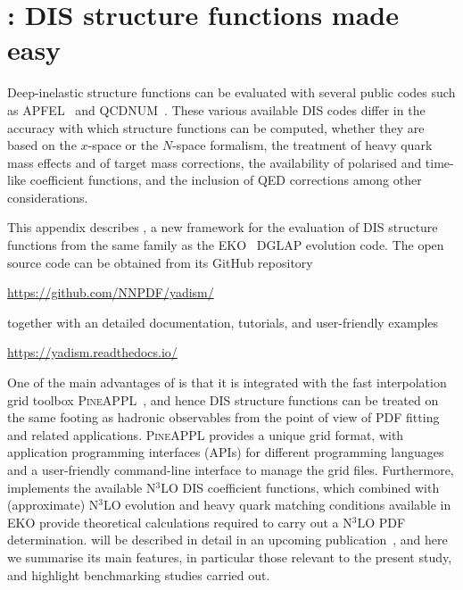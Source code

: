 
\section{\yadism: DIS structure functions made easy}
\label{app/dis:yadism}

Deep-inelastic structure functions can be evaluated with several
public codes such as \textsc{\small APFEL}~\cite{Bertone:2013vaa} and
\textsc{\small QCDNUM}~\cite{Botje:2010ay}.
%
These various available DIS codes differ in the accuracy with which structure functions can be computed,
whether they are based on the $x$-space or the $N$-space formalism,
the treatment of heavy quark mass effects and of target mass corrections, the availability
of polarised and time-like coefficient functions, and
the inclusion of QED corrections among  other considerations.

This appendix describes \yadism, a new framework
for the evaluation of DIS structure functions from the same family
as the \textsc{\small EKO}~\cite{Candido:2022tld} DGLAP evolution code.
%
The open source \yadism code can be obtained from its GitHub repository
\begin{center}
  \url{https://github.com/NNPDF/yadism/}
  \end{center}  
together with an detailed documentation, tutorials, and user-friendly examples
\begin{center}
\url{https://yadism.readthedocs.io/}
\end{center}  
One of the main advantages of \yadism is that it is integrated
with the fast interpolation grid toolbox \textsc{\small PineAPPL}~\cite{Carrazza:2020gss},
and hence DIS structure functions can be treated on the same footing as hadronic observables
from the point of view of PDF fitting and related applications.
%
\textsc{\small PineAPPL} provides a unique grid format, with application programming interfaces (APIs)
for different programming languages
and a user-friendly command-line interface to manage the grid files.
%
Furthermore, \yadism implements the available N$^3$LO DIS coefficient functions,
which combined with (approximate)  N$^3$LO evolution
and heavy quark matching conditions available in \textsc{\small EKO} provide
theoretical calculations required to carry out a N$^3$LO PDF determination.
%
\yadism will be described in detail in an upcoming publication~\cite{yadism},
and here we summarise its main features, in particular those
relevant to the present study, and highlight benchmarking
studies carried out.

